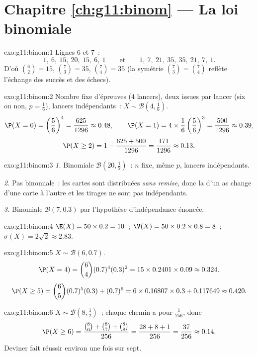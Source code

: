 \section*{Chapitre \ref{ch:g11:binom} --- La loi binomiale}

\begin{solution}{exo:g11:binom:1}
Lignes $6$ et $7$~:
\[
1,\ 6,\ 15,\ 20,\ 15,\ 6,\ 1
\qquad\text{et}\qquad
1,\ 7,\ 21,\ 35,\ 35,\ 21,\ 7,\ 1 .
\]
D'où $\binom62 = 15$, $\binom73 = 35$, $\binom74 = 35$ (la symétrie
$\binom73 = \binom74$ reflète l'échange des succès et des échecs).
\end{solution}

\begin{solution}{exo:g11:binom:2}
Nombre fixe d'épreuves ($4$ lancers), deux issues par lancer (six ou
non, $p = \frac16$), lancers indépendants~:
$X \sim \mathcal B(4, \frac16)$.
\[
\P(X=0) = \left(\frac56\right)^4 = \frac{625}{1296} \approx 0.48,
\qquad
\P(X=1) = 4 \times \frac16\left(\frac56\right)^3 = \frac{500}{1296}
\approx 0.39,
\]
\[
\P(X \geq 2) = 1 - \frac{625 + 500}{1296} = \frac{171}{1296}
\approx 0.13 .
\]
\end{solution}

\begin{solution}{exo:g11:binom:3}
\emph{1.} Binomiale $\mathcal B(20, \frac12)$~: $n$ fixe, même $p$,
lancers indépendants.

\emph{2.} Pas binomiale~: les cartes sont distribuées \emph{sans
remise}, donc la  d'un as change d'une carte à l'autre et les
tirages ne sont pas indépendants.

\emph{3.} Binomiale $\mathcal B(7, 0.3)$ par l'hypothèse d'indépendance
énoncée.
\end{solution}

\begin{solution}{exo:g11:binom:4}
$\E(X) = 50 \times 0.2 = 10$~;
$\V(X) = 50 \times 0.2 \times 0.8 = 8$~;
$\sigma(X) = 2\sqrt2 \approx 2.83$.
\end{solution}

\begin{solution}{exo:g11:binom:5}
$X \sim \mathcal B(6, 0.7)$.
\[
\P(X = 4) = \binom64 (0.7)^4 (0.3)^2 = 15 \times 0.2401 \times 0.09
\approx 0.324 .
\]
\[
\P(X \geq 5) = \binom65 (0.7)^5(0.3) + (0.7)^6
= 6 \times 0.16807 \times 0.3 + 0.117649 \approx 0.420 .
\]
\end{solution}

\begin{solution}{exo:g11:binom:6}
$X \sim \mathcal B\left(8, \frac12\right)$~; chaque chemin a pour
 $\frac{1}{256}$, donc
\[
\P(X \geq 6) = \frac{\binom86 + \binom87 + \binom88}{256}
= \frac{28 + 8 + 1}{256} = \frac{37}{256} \approx 0.14 .
\]
Deviner fait réussir environ une fois sur sept.
\end{solution}

